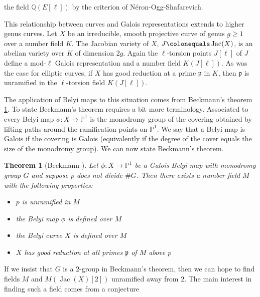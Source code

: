 \documentclass{dcthesis}
\newcommand{\PP}{\mathbb P}
\newcommand{\QQ}{\mathbb Q}
\newcommand{\defi}[1]{\textsf{#1}}
\DeclareMathOperator{\Jac}{Jac}
\numberwithin{equation}{section}
\newtheorem{theorem}[equation]{Theorem}
\theoremstyle{definition}
\theoremstyle{remark}
\begin{document}
{{{    the field $\QQ(E[\ell])$
    by the criterion of
    N\'{e}ron-Ogg-Shafarevich.
    \par
    This relationship between curves and Galois
    representations extends to higher genus
    curves.
    Let $X$ be an
    irreducible, smooth projective
    curve
    of genus $g\geq 1$
    over a number field $K$.
    The Jacobian variety of $X$,
    $J\colonequals \Jac(X)$,
    is an abelian variety over $K$
    of dimension $2g$.
    Again the $\ell$-torsion points
    $J[\ell]$ of $J$
    define a mod-$\ell$ Galois representation
    and a number field $K(J[\ell])$.
    As was the case for elliptic curves,
    if $X$ has good reduction at a prime
    $\mathfrak{p}$ in $K$,
    then $\mathfrak{p}$ is unramified in
    the $\ell$-torsion field
    $K(J[\ell])$.
    \par
    The application of Belyi maps to this
    situation comes from Beckmann's theorem
    \ref{thm:beckmann}.
    To state Beckmann's theorem requires
    a bit more terminology.
    Associated to every Belyi map
    $\phi\colon X\to\PP^1$
    is the \defi{monodromy group}
    of the covering
    obtained by lifting paths around
    the ramification points on $\PP^1$.
    We say that a Belyi map is
    \defi{Galois} if the covering is Galois
    (equivalently if the degree
    of the cover equals the size
    of the monodromy group).
    We can now state Beckmann's theorem.
    \begin{theorem}[Beckmann \cite{beckmann}]
      \label{thm:beckmann}
      Let $\phi\colon X\to\PP^1$
      be a Galois Belyi map with
      monodromy group $G$
      and suppose $p$ does not divide $\# G$.
      Then there exists a number field $M$
      with the following properties:
      \begin{itemize}
        \item
          $p$ is unramified in $M$
        \item
          the Belyi map $\phi$ is defined over $M$
        \item
          the Belyi curve $X$ is defined over $M$
        \item
          $X$ has good reduction at all primes $\mathfrak{p}$
          of $M$ above $p$
      \end{itemize}
    \end{theorem}
    If we insist that $G$ is a $2$-group
    in Beckmann's theorem,
    then we can hope to find
    fields $M$
    and $M(\Jac(X)[2])$ unramified away from $2$.
    The main interest in finding such a field
    comes from a conjecture
}}}
\end{document}
